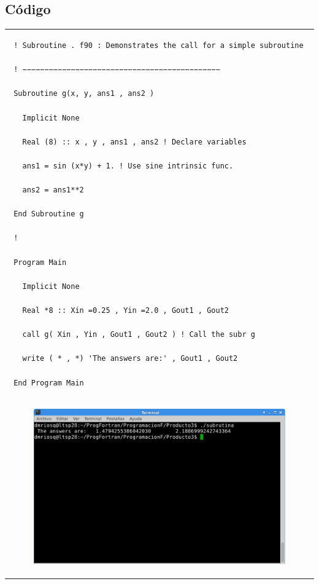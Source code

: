 \documentclass[10pt]{article}
\begin{document}
\subsection{Código}
\begin{tabular}{l}
 \begin{verbatim}  
 ! Subroutine . f90 : Demonstrates the call for a simple subroutine

 ! −−−−−−−−−−−−−−−−−−−−−−−−−−−−−−−−−−−−−−−−−−−−−

 Subroutine g(x, y, ans1 , ans2 )

   Implicit None

   Real (8) :: x , y , ans1 , ans2 ! Declare variables

   ans1 = sin (x*y) + 1. ! Use sine intrinsic func.

   ans2 = ans1**2

 End Subroutine g

 !

 Program Main  

   Implicit None

   Real *8 :: Xin =0.25 , Yin =2.0 , Gout1 , Gout2

   call g( Xin , Yin , Gout1 , Gout2 ) ! Call the subr g

   write ( * , *) 'The answers are:' , Gout1 , Gout2

 End Program Main
 \end{verbatim} \\
\begin{figure}
  \centering
    \includegraphics[scale=0.4]{S}
\end{figure}
\end{tabular}






\end{document}
